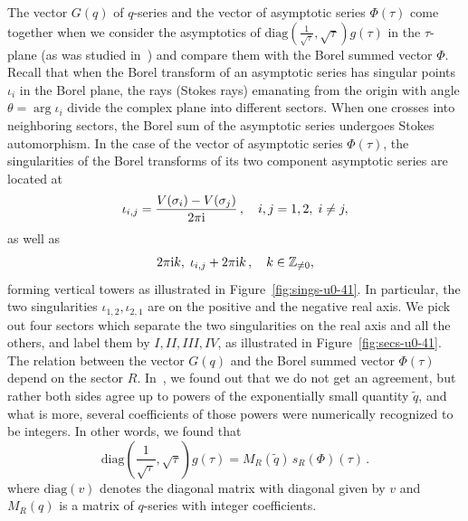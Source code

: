 \documentclass[12pt,reqno]{amsart}
\theoremstyle{definition}
\def\IZ{\mathbb{Z}}
\def\s{\sigma}
\def\tq{\tilde{q}}
\def\ri{\mathrm{i}}
\def\ri{{\rm i}}
\def\diag{\mathrm{diag}}
\newenvironment{psmall}{\left(\begin{smallmatrix}}{\end{smallmatrix}\right)}
\def\IZ{\mathbb{Z}}
\begin{document}
The vector $G(q)$ of $q$-series and the vector of asymptotic
series $\Phi(\tau)$ come together when we consider the asymptotics
of $\diag(\frac{1}{\sqrt{\tau}},\sqrt{\tau}) g(\tau)$
in the $\tau$-plane (as was studied in~\cite{GZ:qseries}) and compare
them with the Borel summed vector $\Phi$.
%
Recall that when the Borel transform of an asymptotic series has
singular points $\iota_i$ in the Borel plane, the rays (Stokes rays)
emanating from the origin with angle $\theta = \arg \iota_i$
divide the complex plane into different sectors.  When one crosses
into neighboring sectors, the Borel sum of the asymptotic series
undergoes Stokes automorphism.
%
In the case of the vector of asymptotic series $\Phi(\tau)$, the
singularities of the Borel transforms of its two component asymptotic
series are located at
\begin{equation}
  \iota_{i,j} = \frac{V(\s_i) - V(\s_j)}{2\pi\ri}\,,\quad i,j=1,2,\;i\neq j,
\end{equation}
as well as
\begin{equation}
  2\pi\ri k,\; \iota_{i,j}+2\pi\ri k\,,
  \quad k\in \IZ_{\neq 0},
\end{equation}
forming vertical towers as illustrated in
Figure~\ref{fig:sings-u0-41}. In particular, the two singularities
$\iota_{1,2}, \iota_{2,1}$ are on the positive and the negative real
axis. We pick out four sectors which separate 
the two singularities on the real axis and all the others, and label
them by $I,II,III,IV$, as illustrated in Figure~\ref{fig:secs-u0-41}.
The relation between the vector $G(q)$ and the Borel summed vector
$\Phi(\tau)$ depend on the sector $R$.
In~\cite{GGM:resurgent}, we found out
that we do not get an agreement, but rather both sides agree up to
powers of the exponentially small quantity $\tq$, and what is more,
several coefficients of those powers were numerically recognized to be
integers. In other words, we found that
% 
\begin{equation}
\label{MR}
\diag(\frac{1}{\sqrt{\tau}},\sqrt{\tau}) g(\tau)
= M_R (\tq) \, s_R(\Phi)(\tau) \,.
\end{equation}
%
where $\diag(v)$ denotes the diagonal matrix with diagonal given by
$v$ and $M_R(q)$ is a matrix of $q$-series with integer coefficients.
\end{document}
